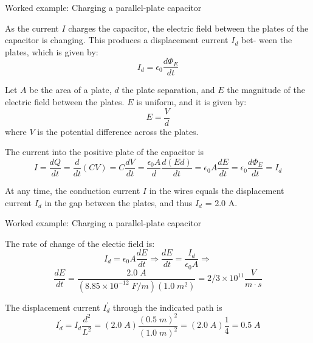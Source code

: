 {%
%
%

\begin{frame}{Worked example: Charging a parallel-plate capacitor}

  As the current $I$ charges the capacitor, the electric field between
  the plates of the capacitor is changing.
  This produces a displacement current $I_{d}$ bet- ween the plates,
  which is given by:
  \begin{equation*}
    I_d = \epsilon_0 \frac{d\Phi_{E}}{dt}
  \end{equation*}

  Let $A$ be the area of a plate, $d$ the plate separation,
  and $E$ the magnitude of the electric field between the plates.
  $E$ is uniform, and it is given by:
  \begin{equation*}
    E = \frac{V}{d}
  \end{equation*}
  where $V$ is the potential difference across the plates.

  The current into the positive plate of the capacitor is
  \begin{equation*}
    I = \frac{dQ}{dt} = \frac{d}{dt}(CV) = C \frac{dV}{dt}
      = \frac{\epsilon_0 A}{d} \frac{d(Ed)}{dt}
      = \epsilon_0 A \frac{dE}{dt} = \epsilon_0 \frac{d\Phi_{E}}{dt} = I_{d}
  \end{equation*}

  At any time, the conduction current $I$ in the wires equals
  the displacement current $I_{d}$ in the gap between the plates,
  and thus $I_{d}$ = 2.0 A.

\end{frame}

%
%
%

\begin{frame}{Worked example: Charging a parallel-plate capacitor}

  The rate of change of the electic field is:
  \begin{equation*}
    I_d = \epsilon_0 A \frac{dE}{dt} \Rightarrow
    \frac{dE}{dt} = \frac{I_d}{\epsilon_0 A} \Rightarrow
  \end{equation*}
  \begin{equation*}
    \frac{dE}{dt} = \frac{2.0 \; A}{(8.85 \times 10^{-12} \; F/m)(1.0 \; m^2)}
                  = 2/3 \times 10^{11} \frac{V}{m \cdot s}
  \end{equation*}

  The displacement current $I_d^\prime$ through the indicated path is
  \begin{equation*}
    I_d^\prime = I_d \frac{d^2}{L^2}
               = (2.0 \; A) \frac{(0.5 \; m)^2}{(1.0 \; m)^2}
               = (2.0 \; A) \frac{1}{4} = 0.5 \; A
  \end{equation*}


\end{frame}}
